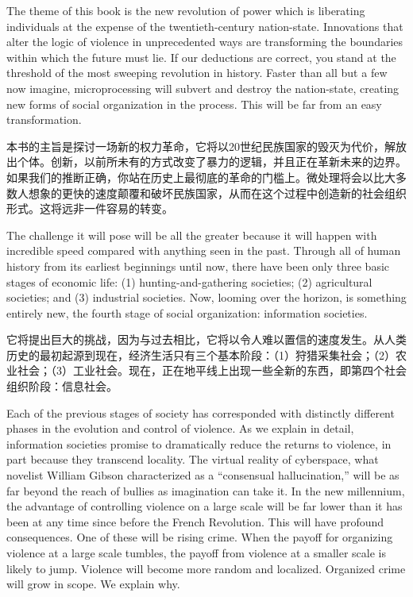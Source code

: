 \begin{Parallel}{97mm}{45mm}
  \ParallelLText
  { The theme of this book is the new revolution of power which is liberating individuals at the expense of the twentieth-century nation-state. Innovations that alter the logic of violence in unprecedented ways are transforming the boundaries within which the future must lie. If our deductions are correct, you stand at the threshold of the most sweeping revolution in history. Faster than all but a few now imagine, microprocessing will subvert and destroy the nation-state, creating new forms of social organization in the process. This will be far from an easy transformation. }

  \ParallelRText
  {\small 本书的主旨是探讨一场新的权力革命，它将以20世纪民族国家的毁灭为代价，解放出个体。创新，以前所未有的方式改变了暴力的逻辑，并且正在革新未来的边界。如果我们的推断正确，你站在历史上最彻底的革命的门槛上。微处理将会以比大多数人想象的更快的速度颠覆和破坏民族国家，从而在这个过程中创造新的社会组织形式。这将远非一件容易的转变。}
  \ParallelPar

  \ParallelLText
  {The challenge it will pose will be all the greater because it will happen with incredible speed compared with anything seen in the past. Through all of human history from its earliest beginnings until now, there have been only three basic stages of economic life: (1) hunting-and-gathering societies; (2) agricultural societies; and (3) industrial societies. Now, looming over the horizon, is something entirely new, the fourth stage of social organization: information societies.  }
  
  \ParallelRText
  {\small 它将提出巨大的挑战，因为与过去相比，它将以令人难以置信的速度发生。从人类历史的最初起源到现在，经济生活只有三个基本阶段：（1）狩猎采集社会；（2）农业社会；（3）工业社会。现在，正在地平线上出现一些全新的东西，即第四个社会组织阶段：信息社会。 }
  \ParallelPar  

  \ParallelLText
  {Each of the previous stages of society has corresponded with distinctly different phases in the evolution and control of violence. As we explain in detail, information societies promise to dramatically reduce the returns to violence, in part because they transcend locality. The virtual reality of cyberspace, what novelist William Gibson characterized as a “consensual hallucination,” will be as far beyond the reach of bullies as imagination can take it. In the new millennium, the advantage of controlling violence on a large scale will be far lower than it has been at any time since before the French Revolution. This will have profound consequences. One of these will be rising crime. When the payoff for organizing violence at a large scale tumbles, the payoff from violence at a smaller scale is likely to jump. Violence will become more random and localized. Organized crime will grow in scope. We explain why.  }
  

\end{Parallel}

